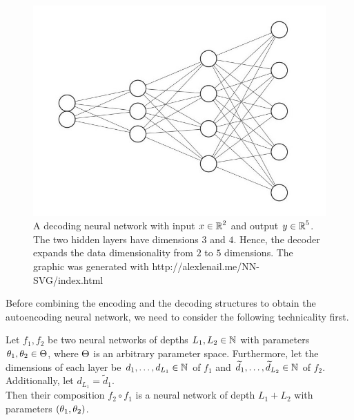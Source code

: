 \begin{figure}
\begin{center}
   \begin{minipage}[b]{0.7\linewidth}
      \includegraphics[width=\linewidth]{decoder}
      \caption{A decoding neural network with input $x\in \operatorname{\mathbb{R}}^2$ and output $y \in \operatorname{\mathbb{R}}^5$. The two hidden layers have dimensions $3$ and $4$. Hence, the decoder expands the data dimensionality from $2$ to $5$ dimensions. The graphic was generated with http://alexlenail.me/NN-SVG/index.html}\label{img_decoder}
	\end{minipage}
\end{center}
\end{figure}

Before combining the encoding and the decoding structures to obtain the autoencoding neural network, we need to consider the following technicality first.

\begin{lemma}\label{lemma:composition_of_nns}
Let $f_1, f_2$ be two neural networks of depths $L_1, L_2 \in \operatorname{\mathbb{N}}$ with parameters $\theta_1, \theta_2 \in \operatorname{\Theta}$, where $\operatorname{\Theta}$ is an arbitrary parameter space. Furthermore, let the dimensions of each layer be $d_1, \ldots, d_{L_1} \in \operatorname{\mathbb{N}}$ of $f_1$ and $\widetilde{d}_1, \ldots, \widetilde{d}_{L_2} \in \operatorname{\mathbb{N}}$ of $f_2$. Additionally, let $d_{L_1} = \tilde{d}_1$.\\
Then their composition $f_2\circ f_1$ is a neural network of depth $L_1 + L_2$ with parameters $(\theta_1, \theta_2)$.
\end{lemma}

